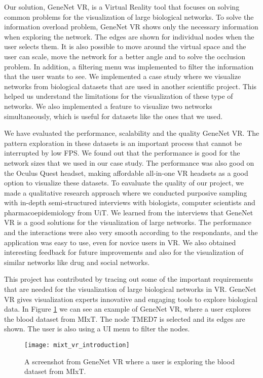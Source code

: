 Our solution, GeneNet VR, is a Virtual Reality tool that focuses on solving common problems for the visualization of large biological networks. To solve the information overload problem, GeneNet VR shows only the necessary information when exploring the network. The edges are shown for individual nodes when the user selects them. It is also possible to move around the virtual space and the user can scale, move the network for a better angle and to solve the occlusion problem. In addition, a filtering menu was implemented to filter the information that the user wants to see. We implemented a case study where we visualize networks from biological datasets that are used in another scientific project. This helped us understand the limitations for the visualization of these type of networks. We also implemented a feature to visualize two networks simultaneously, which is useful for datasets like the ones that we used.

We have evaluated the performance, scalability and the quality GeneNet VR. The pattern exploration in these datasets is an important process that cannot be interrupted by low FPS. We found out that the performance is good for the network sizes that we used in our case study. The performance was also good on the Oculus Quest headset, making affordable all-in-one VR headsets as a good option to visualize these datasets. To eavaluate the quality of our project, we made a qualitative research approach where we conducted purposive sampling with in-depth semi-structured interviews with biologists, computer scientists and pharmacoepidemiology from UiT. We learned from the interviews that GeneNet VR is a good solutions for the visualization of large networks. The performance and the interactions were also very smooth according to the respondants, and the application was easy to use, even for novice users in VR. We also obtained interesting feedback for future improvements and also for the visualization of similar networks like drug and social networks.

This project has contributed by tracing out some of the important requirements that are needed for the visualization of large biological networks in VR. GeneNet VR gives visualization experts innovative and engaging tools to explore biological data. In Figure \ref{fig:bignet_intro} we can see an example of GeneNet VR, where a user explores the blood dataset from MIxT. The node TMED7 is selected and its edges are shown. The user is also using a UI menu to filter the nodes.

\begin{figure}[h!]
    \newlength{\tempheight}
    \setlength{\tempheight}{15ex}
    \centering
    \texttt{[image: mixt\_vr\_introduction]}
    \caption{A screenshot from GeneNet VR where a user is exploring the blood dataset from MIxT.}
    \label{fig:bignet_intro}
\end{figure}

